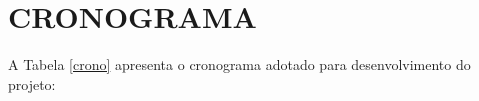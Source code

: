 
\chapter{CRONOGRAMA}

A Tabela \ref{crono} apresenta o cronograma adotado para desenvolvimento do projeto:

